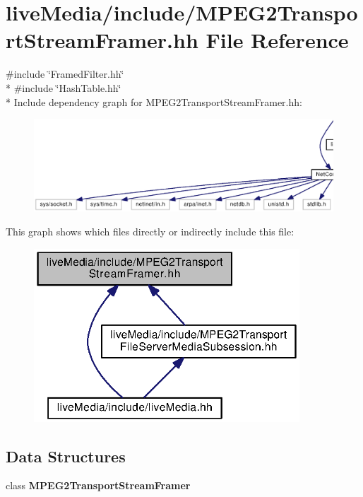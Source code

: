 \section{live\+Media/include/\+M\+P\+E\+G2\+Transport\+Stream\+Framer.hh File Reference}
\label{MPEG2TransportStreamFramer_8hh}
{\ttfamily \#include \char`\"{}Framed\+Filter.\+hh\char`\"{}}\\*
{\ttfamily \#include \char`\"{}Hash\+Table.\+hh\char`\"{}}\\*
Include dependency graph for M\+P\+E\+G2\+Transport\+Stream\+Framer.\+hh\+:
\nopagebreak
\begin{figure}[H]
\begin{center}
\leavevmode
\includegraphics[width=350pt]{MPEG2TransportStreamFramer_8hh__incl}
\end{center}
\end{figure}
This graph shows which files directly or indirectly include this file\+:
\nopagebreak
\begin{figure}[H]
\begin{center}
\leavevmode
\includegraphics[width=282pt]{MPEG2TransportStreamFramer_8hh__dep__incl}
\end{center}
\end{figure}
\subsection*{Data Structures}
\begin{DoxyCompactItemize}
\item 
class {\bf M\+P\+E\+G2\+Transport\+Stream\+Framer}
\end{DoxyCompactItemize}
